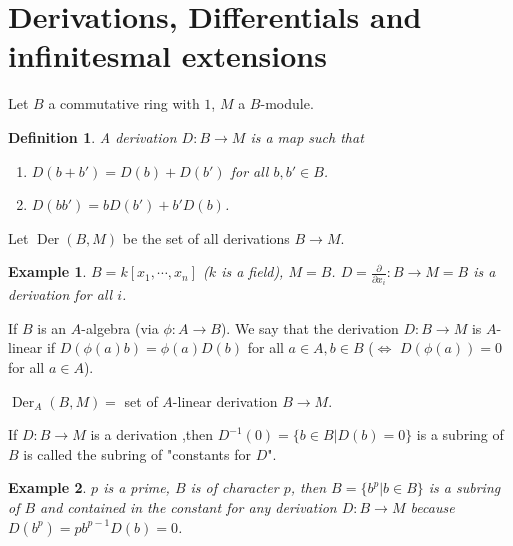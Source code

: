 \documentclass[cs4size]{article}
\newcommand{\inv}{^{-1}}
\newcommand{\ra}{\rightarrow}
\DeclareMathOperator{\Der}{Der}
\newtheorem{definition}{Definition}
\newtheorem{ex}{Example}
\begin{document}
\section{Derivations, Differentials and infinitesmal extensions}
Let $B$ a commutative ring with $1$, $M$ a $B$-module.
\begin{definition}
A derivation $D: B\ra M$ is a map such that
\begin{enumerate}
\item $D(b+b')=D(b)+D(b')$ for all $b,b'\in B$.
\item $D(bb')=bD(b')+b'D(b)$.
\end{enumerate}
\end{definition}
Let $\Der(B,M)$ be the set of all derivations $B\ra M$.
\begin{ex}
$B=k[x_1,\cdots,x_n]$ ($k$ is a field), $M=B$. $D=\frac{\partial}{\partial x_i}: B\ra M=B$ is a derivation for all $i$.
\end{ex}

If $B$ is an $A$-algebra (via $\phi: A\ra B$). We say that the derivation $D: B\ra M$ is $A$-linear if $D(\phi(a)b)=\phi(a)D(b)$ for all $a\in A, b\in B$ ($\Leftrightarrow$ $D(\phi(a))=0$ for all $a\in A$).

$\Der_A(B,M)=$ set of $A$-linear derivation $B\ra M$.

If $D: B\ra M$ is a derivation ,then $D\inv(0)=\{b\in B|D(b)=0\}$ is a subring of $B$ is called the subring of "constants for $D$".

\begin{ex}
$p$ is a prime, $B$ is of character $p$, then $B=\{b^p|b\in B\}$ is a subring of $B$ and contained in the constant for any derivation $D: B\ra M$ because $D(b^p)=pb^{p-1}D(b)=0$.
\end{ex}
\end{document}
